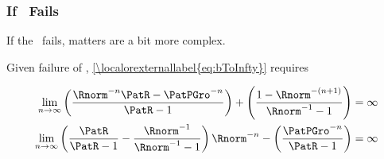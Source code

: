 \documentclass[\econtexRoot/BufferStockTheory]{subfiles}
\begin{document}

\subsubsection{If \FHWC~Fails}
If the \FHWC~fails, matters are a bit more complex.

\begin{comment}
  As noted in the main text, the Finite Value Requirement for such a consumer
  requires $\PatPGro < (\Rfree/\PGro)^{1/\CRRA}$,\footnote{A
    unique well-defined nondegenerate limiting consumption function can
    actually exist even if a nondegenerate value function does not.  But
    the parametric combinations required for this are somewhat peculiar
    (including both $\Rfree < 1$ and $\PGro < 1$); but we restrict our attention
    to the more useful and plausible cases with finite value.} which is stronger (holds
  in strictly fewer circumstances) than the \PFGIC~condition $\PatPGro < 1$.
  Thus, the \PFGIC~is an implication of $\cncl{\FHWC}$.
\end{comment}

Given failure of \FHWC, \eqref{\localorexternallabel{eq:bToInfty}} requires

\begin{equation}\begin{gathered}\begin{aligned}
  \lim_{n \rightarrow \infty} \left(\frac{\Rnorm^{-n}\PatR-\PatPGro^{-n}}{\PatR-1}\right) + \left(\frac{1-\Rnorm^{-(n+1)}}{\Rnorm^{-1}-1}\right)  & = \infty \notag
  \\   \lim_{n \rightarrow \infty} \left(\frac{\PatR}{\PatR-1}-\frac{\Rnorm^{-1}}{\Rnorm^{-1}-1}\right)\Rnorm^{-n}-\left(\frac{\PatPGro^{-n}}{\PatR-1}\right)  & = \infty \label{eq:FHWCfails} 
\end{aligned}\end{gathered}\end{equation}
\hypertarget{PFGICHoldsFHWCFailsRICFailsDiscuss}{}
\end{document}
